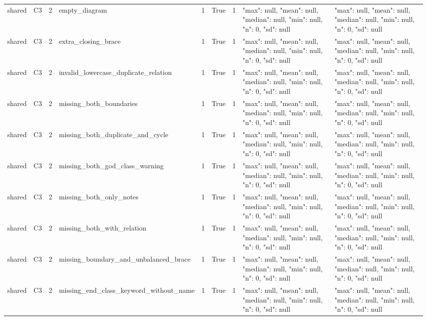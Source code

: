 \begin{tabular}{lllllllll}
shared & C3 & 2 & empty\_diagram & 1 & True & 1 & {"max": null, "mean": null, "median": null, "min": null, "n": 0, "sd": null} & {"max": null, "mean": null, "median": null, "min": null, "n": 0, "sd": null} \\
shared & C3 & 2 & extra\_closing\_brace & 1 & True & 1 & {"max": null, "mean": null, "median": null, "min": null, "n": 0, "sd": null} & {"max": null, "mean": null, "median": null, "min": null, "n": 0, "sd": null} \\
shared & C3 & 2 & invalid\_lowercase\_duplicate\_relation & 1 & True & 1 & {"max": null, "mean": null, "median": null, "min": null, "n": 0, "sd": null} & {"max": null, "mean": null, "median": null, "min": null, "n": 0, "sd": null} \\
shared & C3 & 2 & missing\_both\_boundaries & 1 & True & 1 & {"max": null, "mean": null, "median": null, "min": null, "n": 0, "sd": null} & {"max": null, "mean": null, "median": null, "min": null, "n": 0, "sd": null} \\
shared & C3 & 2 & missing\_both\_duplicate\_and\_cycle & 1 & True & 1 & {"max": null, "mean": null, "median": null, "min": null, "n": 0, "sd": null} & {"max": null, "mean": null, "median": null, "min": null, "n": 0, "sd": null} \\
shared & C3 & 2 & missing\_both\_god\_class\_warning & 1 & True & 1 & {"max": null, "mean": null, "median": null, "min": null, "n": 0, "sd": null} & {"max": null, "mean": null, "median": null, "min": null, "n": 0, "sd": null} \\
shared & C3 & 2 & missing\_both\_only\_notes & 1 & True & 1 & {"max": null, "mean": null, "median": null, "min": null, "n": 0, "sd": null} & {"max": null, "mean": null, "median": null, "min": null, "n": 0, "sd": null} \\
shared & C3 & 2 & missing\_both\_with\_relation & 1 & True & 1 & {"max": null, "mean": null, "median": null, "min": null, "n": 0, "sd": null} & {"max": null, "mean": null, "median": null, "min": null, "n": 0, "sd": null} \\
shared & C3 & 2 & missing\_boundary\_and\_unbalanced\_brace & 1 & True & 1 & {"max": null, "mean": null, "median": null, "min": null, "n": 0, "sd": null} & {"max": null, "mean": null, "median": null, "min": null, "n": 0, "sd": null} \\
shared & C3 & 2 & missing\_end\_class\_keyword\_without\_name & 1 & True & 1 & {"max": null, "mean": null, "median": null, "min": null, "n": 0, "sd": null} & {"max": null, "mean": null, "median": null, "min": null, "n": 0, "sd": null} \\

\end{tabular}
